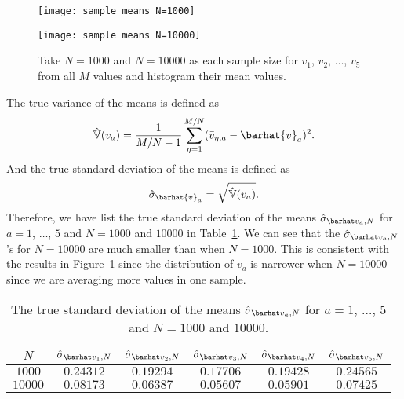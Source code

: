 \begin{figure}
    \centering
    \begin{minipage}[t]{0.8\linewidth}
        \centering
        \texttt{[image: sample means N=1000]}
        \label{fig:hist_mean:a}
    \end{minipage}
    \hfill
    \begin{minipage}[t]{0.8\linewidth}
        \centering
        \texttt{[image: sample means N=10000]}
        \label{fig:hist_mean:b}
    \end{minipage}
    \caption{Take \(N = 1000\) and \(N = 10000\) as each sample size
        for \(v_1\), \(v_2\), \(\ldots\), \(v_5\) from all \(M\) values
        and histogram their mean values.}
    \label{fig:hist_mean}
\end{figure}

The true variance of the means is defined as
%
\begin{equation}
    \hat{\mathbb{V}}(v_a) = \frac{ 1 }{ M/N - 1 }
    \sum_{\eta=1}^{M/N} (\bar{v}_{\eta,a} - \barhat{v}_a)^2.
\end{equation}
%
And the true standard deviation of the means is defined as
%
\begin{equation}
    \hat{\sigma}_{\barhat{v}_a} = \sqrt{\hat{\mathbb{V}}(v_a)}.
\end{equation}
%
Therefore, we have list the true standard deviation of the means
\(\sgbar{a}\) for \(a = 1\), \(\ldots\), \(5\) and \(N = 1000\) and \(10000\)
in Table~\ref{tab:truestd}.
We can see that the \(\sgbar{a}\)'s for \(N = 10000\) are much smaller than
when \(N = 1000\). This is consistent with the results in Figure~\ref{fig:hist_mean}
since the distribution of \(\bar{v}_a\) is narrower when \(N = 10000\) since
we are averaging more values in one sample.

\begin{table}[H]
    \centering
    \caption{The true standard deviation of the means
        \(\sgbar{a}\) for \(a = 1\), \(\ldots\), \(5\) and \(N = 1000\) and \(10000\).}
    \label{tab:truestd}
    \begin{tabular}{@{}cccccc@{}}
        \toprule
        \(N\)     & \(\sgbar{1}\) & \(\sgbar{2}\) & \(\sgbar{3}\) & \(\sgbar{4}\) & \(\sgbar{5}\) \\
        \midrule
        \(1000\)  & \(0.24312\)   & \(0.19294\)   & \(0.17706\)   & \(0.19428\)   & \(0.24565\)   \\
        \(10000\) & \(0.08173\)   & \(0.06387\)   & \(0.05607\)   & \(0.05901\)   & \(0.07425\)   \\
        \bottomrule
    \end{tabular}
\end{table}


